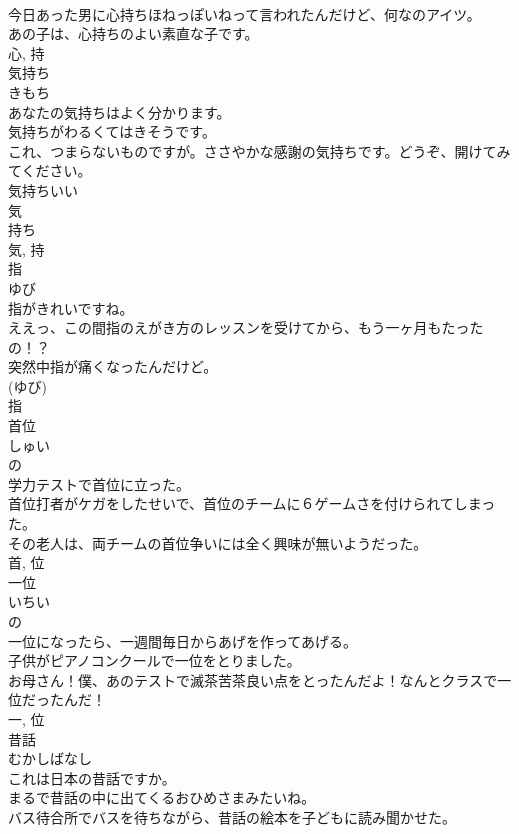 \documentclass[8pt]{extreport}
\begin{document}
\begin{CJK}{UTF8}{min}
\\	今日あった男に心持ちほねっぽいねって言われたんだけど、何なのアイツ。	
\\	あの子は、心持ちのよい素直な子です。	
\\	心, 持	
\\	気持ち	
\\	きもち	
\\	あなたの気持ちはよく分かります。	
\\	気持ちがわるくてはきそうです。	
\\	これ、つまらないものですが。ささやかな感謝の気持ちです。どうぞ、開けてみてください。	
\\	気持ちいい 
\\	気 
\\	持ち 
\\	気, 持	
\\	指	
\\	ゆび	
\\	指がきれいですね。	
\\	ええっ、この間指のえがき方のレッスンを受けてから、もう一ヶ月もたったの！？	
\\	突然中指が痛くなったんだけど。	
\\	(ゆび) 
\\	指	
\\	首位	
\\	しゅい	
\\	の 
\\	学力テストで首位に立った。	
\\	首位打者がケガをしたせいで、首位のチームに６ゲームさを付けられてしまった。	
\\	その老人は、両チームの首位争いには全く興味が無いようだった。	
\\	首, 位	
\\	一位	
\\	いちい	
\\	の 
\\	一位になったら、一週間毎日からあげを作ってあげる。	
\\	子供がピアノコンクールで一位をとりました。	
\\	お母さん！僕、あのテストで滅茶苦茶良い点をとったんだよ！なんとクラスで一位だったんだ！	
\\	一, 位	
\\	昔話	
\\	むかしばなし	
\\	これは日本の昔話ですか。	
\\	まるで昔話の中に出てくるおひめさまみたいね。	
\\	バス待合所でバスを待ちながら、昔話の絵本を子どもに読み聞かせた。	

\end{CJK}
\end{document}
